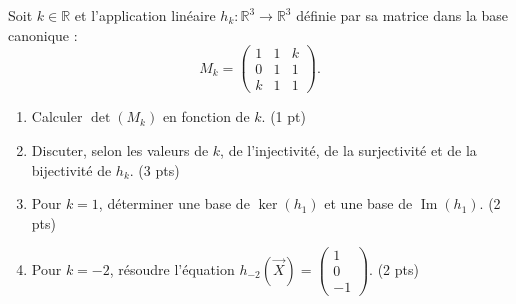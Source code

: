 \documentclass[11pt]{article}
\begin{document}
\begin{exercice}
Soit $k \in \mathbb{R}$ et l'application linéaire $h_k : \mathbb{R}^3 \to \mathbb{R}^3$ définie par sa matrice dans la base canonique :
\[
M_k = \begin{pmatrix}
1 & 1 & k \\
0 & 1 & 1 \\
k & 1 & 1
\end{pmatrix}.
\]
\begin{enumerate}
    \item Calculer $\det(M_k)$ en fonction de $k$. \hfill (1 pt)
    \item Discuter, selon les valeurs de $k$, de l'injectivité, de la surjectivité et de la bijectivité de $h_k$. \hfill (3 pts)
    \item Pour $k=1$, déterminer une base de $\ker(h_1)$ et une base de $\operatorname{Im}(h_1)$. \hfill (2 pts)
    \item Pour $k=-2$, résoudre l'équation $h_{-2}(\vec{X}) = \begin{pmatrix}1\\0\\-1\end{pmatrix}$. \hfill (2 pts)
\end{enumerate}
\end{exercice}
\end{document}

